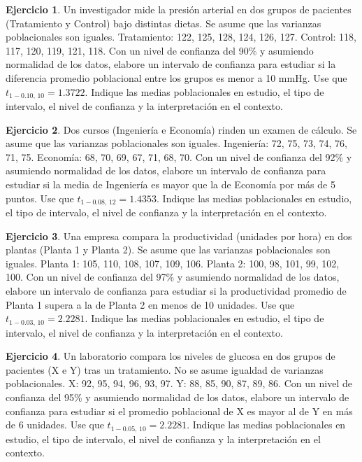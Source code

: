 \documentclass[
  11pt,
]{book}
\theoremstyle{definition}
\theoremstyle{definition}
\theoremstyle{definition}
\newtheorem{exercise}{Ejercicio}[chapter]
\theoremstyle{definition}
\theoremstyle{remark}
\begin{document}
\begin{exercise}
Un investigador mide la presión arterial en dos grupos de pacientes (Tratamiento y Control) bajo distintas dietas. Se asume que las varianzas poblacionales son iguales. Tratamiento: 122, 125, 128, 124, 126, 127. Control: 118, 117, 120, 119, 121, 118. Con un nivel de confianza del 90\% y asumiendo normalidad de los datos, elabore un intervalo de confianza para estudiar si la diferencia promedio poblacional entre los grupos es menor a 10 mmHg. Use que \(t_{1-0.10,\,10} = 1.3722\). Indique las medias poblacionales en estudio, el tipo de intervalo, el nivel de confianza y la interpretación en el contexto.
\end{exercise}

\begin{exercise}
Dos cursos (Ingeniería e Economía) rinden un examen de cálculo. Se asume que las varianzas poblacionales son iguales. Ingeniería: 72, 75, 73, 74, 76, 71, 75. Economía: 68, 70, 69, 67, 71, 68, 70. Con un nivel de confianza del 92\% y asumiendo normalidad de los datos, elabore un intervalo de confianza para estudiar si la media de Ingeniería es mayor que la de Economía por más de 5 puntos. Use que \(t_{1-0.08,\,12} = 1.4353\). Indique las medias poblacionales en estudio, el tipo de intervalo, el nivel de confianza y la interpretación en el contexto.
\end{exercise}

\begin{exercise}
Una empresa compara la productividad (unidades por hora) en dos plantas (Planta 1 y Planta 2). Se asume que las varianzas poblacionales son iguales. Planta 1: 105, 110, 108, 107, 109, 106. Planta 2: 100, 98, 101, 99, 102, 100. Con un nivel de confianza del 97\% y asumiendo normalidad de los datos, elabore un intervalo de confianza para estudiar si la productividad promedio de Planta 1 supera a la de Planta 2 en menos de 10 unidades. Use que \(t_{1-0.03,\,10} = 2.2281\). Indique las medias poblacionales en estudio, el tipo de intervalo, el nivel de confianza y la interpretación en el contexto.
\end{exercise}

\begin{exercise}
Un laboratorio compara los niveles de glucosa en dos grupos de pacientes (X e Y) tras un tratamiento. No se asume igualdad de varianzas poblacionales. X: 92, 95, 94, 96, 93, 97. Y: 88, 85, 90, 87, 89, 86. Con un nivel de confianza del 95\% y asumiendo normalidad de los datos, elabore un intervalo de confianza para estudiar si el promedio poblacional de X es mayor al de Y en más de 6 unidades. Use que \(t_{1-0.05,\,10} = 2.2281\). Indique las medias poblacionales en estudio, el tipo de intervalo, el nivel de confianza y la interpretación en el contexto.
\end{exercise}
\end{document}
